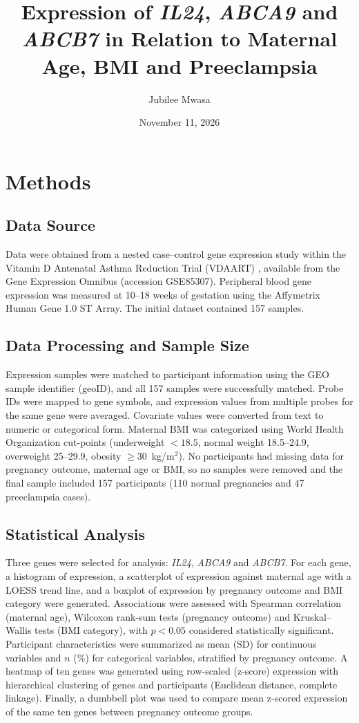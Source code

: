 \documentclass[11pt]{article}
\title{Expression of \textit{IL24}, \textit{ABCA9} and \textit{ABCB7}
in Relation to Maternal Age, BMI and Preeclampsia}
\author{Jubilee Mwasa}
\date{November 11, 2026}
\begin{document}
\maketitle

\section{Methods}
\subsection{Data Source}
Data were obtained from a nested case--control gene expression study within
the Vitamin D Antenatal Asthma Reduction Trial (VDAART) \cite{mirzakhani2016},
available from the Gene Expression Omnibus (accession GSE85307). Peripheral
blood gene expression was measured at 10--18 weeks of gestation using the
Affymetrix Human Gene 1.0 ST Array. The initial dataset contained 157 samples.

\subsection{Data Processing and Sample Size}
Expression samples were matched to participant information using the GEO
sample identifier (geoID), and all 157 samples were successfully matched.
Probe IDs were mapped to gene symbols, and expression values from multiple
probes for the same gene were averaged. Covariate values were converted from
text to numeric or categorical form. Maternal BMI was categorized using World
Health Organization cut-points (underweight $<18.5$, normal weight
18.5--24.9, overweight 25--29.9, obesity $\geq 30$~kg/m$^2$). No participants
had missing data for pregnancy outcome, maternal age or BMI, so no samples
were removed and the final sample included 157 participants (110 normal
pregnancies and 47 preeclampsia cases).

\subsection{Statistical Analysis}
Three genes were selected for analysis: \textit{IL24}, \textit{ABCA9} and
\textit{ABCB7}. For each gene, a histogram of expression, a scatterplot of
expression against maternal age with a LOESS trend line, and a boxplot of
expression by pregnancy outcome and BMI category were generated. Associations
were assessed with Spearman correlation (maternal age), Wilcoxon rank-sum
tests (pregnancy outcome) and Kruskal--Wallis tests (BMI category), with
$p < 0.05$ considered statistically significant. Participant characteristics
were summarized as mean (SD) for continuous variables and $n$ (\%) for
categorical variables, stratified by pregnancy outcome. A heatmap of ten genes
was generated using row-scaled (z-score) expression with hierarchical
clustering of genes and participants (Euclidean distance, complete linkage).
Finally, a dumbbell plot was used to compare mean z-scored expression of the
same ten genes between pregnancy outcome groups.
\end{document}
